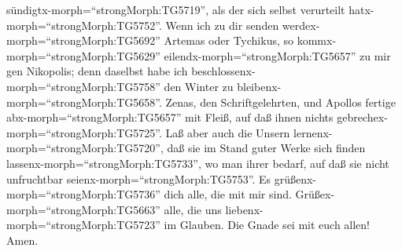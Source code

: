 sündigtx-morph=``strongMorph:TG5719'', als der sich selbst verurteilt
hatx-morph=``strongMorph:TG5752''.  Wenn ich zu dir senden
werdex-morph=``strongMorph:TG5692'' Artemas oder Tychikus, so
kommx-morph=``strongMorph:TG5629'' eilendx-morph=``strongMorph:TG5657''
zu mir gen Nikopolis; denn daselbst habe ich
beschlossenx-morph=``strongMorph:TG5758'' den Winter zu
bleibenx-morph=``strongMorph:TG5658''.  Zenas, den
Schriftgelehrten, und Apollos fertige abx-morph=``strongMorph:TG5657''
mit Fleiß, auf daß ihnen nichts gebrechex-morph=``strongMorph:TG5725''.
 Laß aber auch die Unsern
lernenx-morph=``strongMorph:TG5720'', daß sie im Stand guter Werke sich
finden lassenx-morph=``strongMorph:TG5733'', wo man ihrer bedarf, auf
daß sie nicht unfruchtbar seienx-morph=``strongMorph:TG5753''.
 Es grüßenx-morph=``strongMorph:TG5736'' dich alle, die mit
mir sind. Grüßex-morph=``strongMorph:TG5663'' alle, die uns
liebenx-morph=``strongMorph:TG5723'' im Glauben. Die Gnade sei mit euch
allen! Amen.
